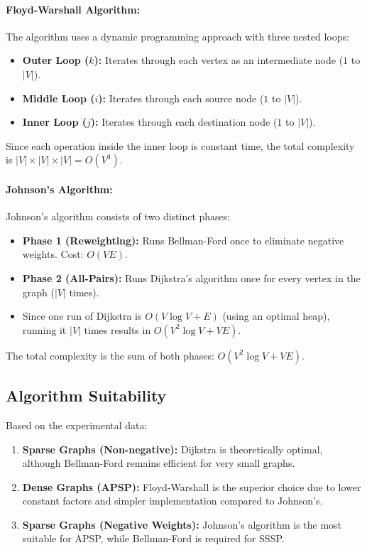 \documentclass[12pt, a4paper]{article}
\begin{document}
\paragraph{Floyd-Warshall Algorithm:}
The algorithm uses a dynamic programming approach with three nested loops:
\begin{itemize}
    \item \textbf{Outer Loop ($k$):} Iterates through each vertex as an intermediate node ($1$ to $|V|$).
    \item \textbf{Middle Loop ($i$):} Iterates through each source node ($1$ to $|V|$).
    \item \textbf{Inner Loop ($j$):} Iterates through each destination node ($1$ to $|V|$).
\end{itemize}
Since each operation inside the inner loop is constant time, the total complexity is $|V| \times |V| \times |V| = O(V^3)$.

\paragraph{Johnson's Algorithm:}
Johnson's algorithm consists of two distinct phases:
\begin{itemize}
    \item \textbf{Phase 1 (Reweighting):} Runs Bellman-Ford once to eliminate negative weights. Cost: $O(VE)$.
    \item \textbf{Phase 2 (All-Pairs):} Runs Dijkstra's algorithm once for every vertex in the graph ($|V|$ times).
    \item Since one run of Dijkstra is $O(V \log V + E)$ (using an optimal heap), running it $|V|$ times results in $O(V^2 \log V + VE)$.
\end{itemize}
The total complexity is the sum of both phases: $O(V^2 \log V + VE)$.

\subsection{Algorithm Suitability}
Based on the experimental data:
\begin{enumerate}
    \item \textbf{Sparse Graphs (Non-negative):} Dijkstra is theoretically optimal, although Bellman-Ford remains efficient for very small graphs.
    \item \textbf{Dense Graphs (APSP):} Floyd-Warshall is the superior choice due to lower constant factors and simpler implementation compared to Johnson's.
    \item \textbf{Sparse Graphs (Negative Weights):} Johnson’s algorithm is the most suitable for APSP, while Bellman-Ford is required for SSSP.
\end{enumerate}
\end{document}
